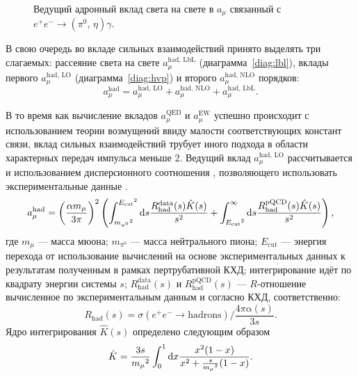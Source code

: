 \begin{figure}[htbp]
\begin{minipage}[t]{0.24\textwidth}
        \label{diag:lbl_Pg}
        \caption{Ведущий адронный вклад света на свете в $a_\mu$ связанный с $e^+ e^- \to ( \pi^0, \, \eta ) \gamma$.}
    \end{minipage}
\end{figure}
В свою очередь во вкладе сильных взаимодействий принято выделять три слагаемых:
рассеяние света на свете $a_\mu^{\text{had, LbL}}$ (диаграмма~\ref{diag:lbl}),
вклады первого $a_\mu^{\text{had, LO}}$ (диаграмма~\ref{diag:hvp}) и второго $a_\mu^{\text{had, NLO}}$ порядков:
\begin{equation}
    a_\mu^{\text{had}}
    =
    a_\mu^{\text{had, LO}}
    +
    a_\mu^{\text{had, NLO}}
    +
    a_\mu^{\text{had, LbL}}.
\end{equation}

В то время как вычисление вкладов $a_\mu^{\text{QED}}$ и $a_\mu^{\text{EW}}$ успешно происходит с использованием теории возмущений ввиду малости соответствующих констант связи,
вклад сильных взаимодействий трубует иного подхода в области характерных передач импульса меньше \SI{2}{\GeVr}.
Ведущий вклад $a_\mu^{\text{had, LO}}$ рассчитывается и использованием дисперсионного соотношения
\cite{Bouchiat1961, Durand:1962zzb, Kinoshita:1967txv, Gourdin:1969dm},
позволяющего использовать экспериментальные данные \cite{Jegerlehner:2017gek}.
\begin{equation}
   	a_\mu^{\text{had}} =
   	\left( \frac{\alpha m_\mu}{3 \pi} \right)^2
   	\left(
   		\int_{{m_{\pi^0}}^2}^{{E_{\text{cut}}}^2} \dif s
   		\frac{ R_{\text{had}}^{\text{data}}(s) \hat{K}(s) }{ s^2 }
   		+
   		\int_{{E_{\text{cut}}}^2}^{\infty} \dif s
   		\frac{ R_{\text{had}}^{\text{pQCD}}(s) \hat{K}(s) }{ s^2 }
   	\right) ,
\end{equation}
где
$ m_\mu $ --- масса мюона;
$ m_{\pi^0}$ --- масса нейтрального пиона;
$ E_{\text{cut}} $ --- энергия перехода от использование вычислений на основе экспериментальных данных к результатам полученным в рамках пертрубативной КХД;
интегрирование идёт по квадрату энергии системы $s$;
$ R_{\text{had}}^{\text{data}}(s) $ и $ R_{\text{had}}^{\text{pQCD}}(s) $ --- $R$-отношение вычисленное по экспериментальным данным и согласно КХД, соответственно:
\begin{equation}
	R_{\text{had}} (s) =
   	\sigma(e^+ e^- \to \text{hadrons})
  	/
  	\frac{4 \pi \alpha(s)}{3 s} .
\end{equation}
Ядро интегрирования $\hat{K}(s)$ определено следующим образом
\begin{equation}
	\hat{K}
  	=
   	\frac{3 s}{{m_\mu}^2}
  	\int_0^1 \dif x
  	\frac{ x^2 (1-x) }{ x^2 + \frac{s}{{m_\mu}^2} (1-x) } .
\end{equation}


